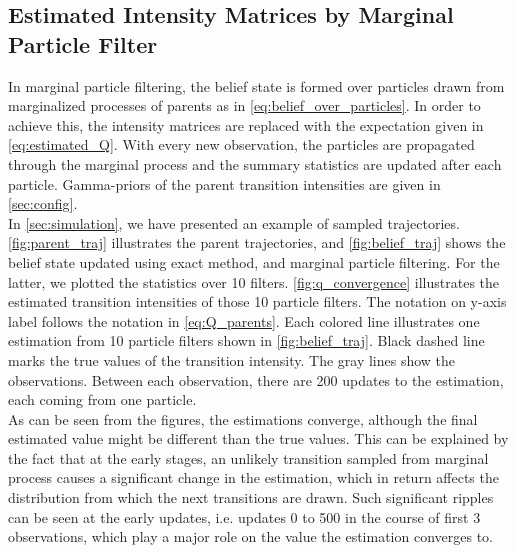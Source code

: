 \subsection{Estimated Intensity Matrices by Marginal Particle Filter}
In marginal particle filtering, the belief state is formed over particles drawn from marginalized processes of parents as in \autoref{eq:belief_over_particles}. In order to achieve this, the intensity matrices are replaced with the expectation given in \autoref{eq:estimated_Q}. With every new observation, the particles are propagated through the marginal process and the summary statistics are updated after each particle. Gamma-priors of the parent transition intensities are given in \cref{sec:config}. \\
In \cref{sec:simulation}, we have presented an example of sampled trajectories. \autoref{fig:parent_traj} illustrates the parent trajectories, and \autoref{fig:belief_traj} shows the belief state updated using exact method, and marginal particle filtering. For the latter, we plotted the statistics over 10 filters. \autoref{fig:q_convergence} illustrates the estimated transition intensities of those 10 particle filters. The notation on y-axis label follows the notation in \autoref{eq:Q_parents}. Each colored line illustrates one estimation from 10 particle filters shown in \autoref{fig:belief_traj}. Black dashed line marks the true values of the transition intensity. The gray lines show the observations. Between each observation, there are 200 updates to the estimation, each coming from one particle. \\
As can be seen from the figures, the estimations converge, although the final estimated value might be different than the true values. This can be explained by the fact that at the early stages, an unlikely transition sampled from marginal process causes a significant change in the estimation, which in return affects the distribution from which the next transitions are drawn. Such significant ripples can be seen at the early updates, i.e. updates 0 to 500 in the course of first 3 observations, which play a major role on the value the estimation converges to.
